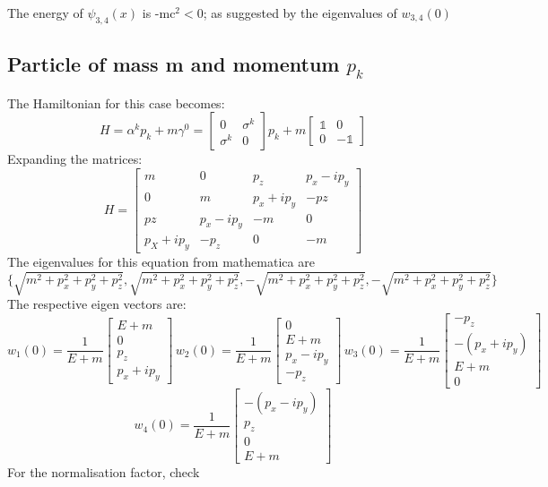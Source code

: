 \documentclass[11pt]{article}
\begin{document}
	 The energy of \(\psi_{3,4}(x)\) is -mc$^2<0$; as suggested by the eigenvalues of \(w_{3,4}(0)\) 
	 
	 \subsection{Particle of mass m and momentum $p_k$} 
	 
	 The Hamiltonian for this case becomes:
	 \[
	 	H = \alpha^k p_k +m\gamma^0 = 
	 	\begin{bmatrix}0 & \sigma^k\\\sigma^k & 0 \end{bmatrix}p_k + m	\begin{bmatrix}\mathbb{1} & 0\\0 & -\mathbb{1} \end{bmatrix}
	 \]
	 Expanding the matrices:
	 \[
	 	H = \begin{bmatrix}m&0&p_z&p_x-ip_y\\0&m&p_x+ip_y&-pz\\pz&p_x-ip_y&-m&0\\p_X+ip_y&-p_z&0&-m\end{bmatrix}
	 \]
	 The eigenvalues for this equation from mathematica are\\
	 \[
	 	\{\sqrt{m^2+p_x^2+p_y^2+p_z^2},\sqrt{m^2+p_x^2+p_y^2+p_z^2},-\sqrt{m^2+p_x^2+p_y^2+p_z^2},-\sqrt{m^2+p_x^2+p_y^2+p_z^2}\}
	 \]
	 The respective eigen vectors are:
	 \[
	 	w_1(0)=\frac{1}{E+m}\begin{bmatrix} E+m\\0\\p_z\\p_x+ip_y\end{bmatrix} \, w_2(0)=\frac{1}{E+m}\begin{bmatrix} 0\\E+m\\p_x-ip_y\\-p_z \end{bmatrix} \, 
	 	w_3(0)=\frac{1}{E+m}\begin{bmatrix} -p_z\\-(p_x+ip_y)\\E+m\\0\end{bmatrix} \, 
	 \]
	 \[
	 	w_4(0)=\frac{1}{E+m}\begin{bmatrix} -(p_x-ip_y)\\p_z\\0\\E+m\end{bmatrix}	
	 \]
	 For the normalisation factor, check
\end{document}
